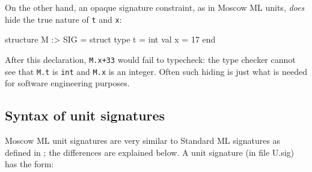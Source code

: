 \documentclass[fleqn]{article}
\begin{document}
On the other hand, an opaque signature constraint, as in Moscow ML
units, {\em does\/} hide the true nature of {\tt t} and {\tt x}:

\begin{program}
structure M :> SIG = struct
    type t = int
    val x = 17
end                             
\end{program}

\noindent After this declaration, {\tt M.x+33} would fail to
typecheck: the type checker cannot see that {\tt M.t} is {\tt int} and
{\tt M.x} is an integer.  Often such hiding is just what is needed for
software engineering purposes.


\subsection{Syntax of unit signatures}
\label{sec-syntax-signatures}

Moscow ML unit signatures are very similar to Standard ML signatures
as defined in \cite{Milner:1997:TheDefinition}; the differences are
explained below.  A unit signature (in file U.sig) has the form:
\end{document}
